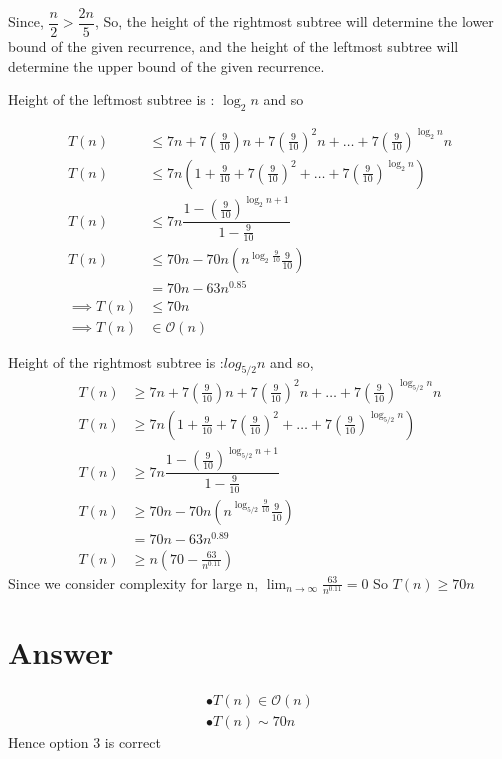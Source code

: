 \documentclass[journal,12pt,twocolumn]{IEEEtran}
\begin{document}
Since, $\dfrac{n}{2}>\dfrac{2n}{5}$, So, the height of the rightmost subtree will determine the lower bound of the given recurrence, and the height of the leftmost subtree will determine the upper bound of the given recurrence.

Height of the leftmost subtree is : $\log_{2}n $ and so

\begin{align}
    T(n) &\leqslant 7n + 7(\frac{9}{10})n + 7(\frac{9}{10})^2 n + \dots + 7(\frac{9}{10})^{\log_{2}n} n \\
    T(n) &\leqslant 7n(1 + \frac{9}{10} + 7(\frac{9}{10})^2 + \dots + 7(\frac{9}{10})^{\log_{2}n}) \\
    T(n) &\leqslant 7n\dfrac{1-(\frac{9}{10})^{\log_{2} n + 1}}{1-\frac{9}{10}} \\
    T(n) &\leqslant 70n - 70n(n^{\log_{2}\frac{9}{10}} \frac{9}{10}) \\
    &= 70n - 63n^{0.85} \\
    \implies T(n) &\leqslant 70n\\
    \implies T(n) &\in \mathcal{O}(n)
\end{align}

Height of the rightmost subtree is :$log_{5/2}n$ and so,
\begin{align}
    T(n) &\geqslant 7n + 7(\frac{9}{10})n + 7(\frac{9}{10})^2 n + \dots + 7(\frac{9}{10})^{\log_{5/2}n} n \\
    T(n) &\geqslant 7n(1 + \frac{9}{10} + 7(\frac{9}{10})^2 + \dots + 7(\frac{9}{10})^{\log_{5/2}n}) \\
    T(n) &\geqslant 7n\dfrac{1-(\frac{9}{10})^{\log_{5/2} n + 1}}{1-\frac{9}{10}} \\
    T(n) &\geqslant 70n - 70n(n^{\log_{5/2}\frac{9}{10}} \frac{9}{10}) \\
    &= 70n - 63n^{0.89} \\
    T(n) &\geqslant n(70 - \frac{63}{n^{0.11}})
\end{align}
Since we consider complexity for large n,
$\lim_{n \to \infty} \frac{63}{n^{0.11}} = 0$
So $T(n) \geqslant 70n$

\section{Answer}
\begin{align}
\bullet T(n) \in \mathcal{O}(n) \\
\bullet T(n) \sim 70n
\end{align}
Hence option 3 is correct
\end{document}
